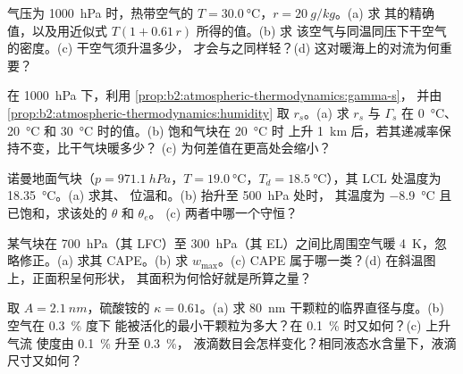 \begin{exercise}[$\star\star$]\label{exo:b2:atmospheric-thermodynamics:5}
气压为 \qty{1000}{hPa} 时，热带空气的 $T = \qty{30.0}{\celsius}$，$r = \qty{20}{g/kg}$。(a) 求
其的精确值，以及用近似式 $T(1 + 0.61\,r)$ 所得的值。(b) 求
该空气与同温同压下干空气的密度。(c) 干空气须升温多少，
才会与之同样轻？(d) 这对暖海上的对流为何重要？
\end{exercise}

\begin{exercise}[$\star\star$]\label{exo:b2:atmospheric-thermodynamics:6}
在 \qty{1000}{hPa} 下，利用 \cref{prop:b2:atmospheric-thermodynamics:gamma-s}，
并由 \cref{prop:b2:atmospheric-thermodynamics:humidity} 取 $r_s$。(a) 求 $r_s$ 与 $\Gamma_s$ 在
\qty{0}{\celsius}、\qty{20}{\celsius} 和 \qty{30}{\celsius} 时的值。(b) 饱和气块在 \qty{20}{\celsius} 时
上升 \qty{1}{km} 后，若其递减率保持不变，比干气块暖多少？
(c) 为何差值在更高处会缩小？
\end{exercise}

\begin{exercise}[$\star\star$]\label{exo:b2:atmospheric-thermodynamics:7}
诺曼地面气块（$p = \qty{971.1}{hPa}$，$T = \qty{19.0}{\celsius}$，$T_d =
\qty{18.5}{\celsius}$），其 LCL 处温度为 \qty{18.35}{\celsius}。(a) 求其、
位温和。(b) 抬升至 \qty{500}{hPa} 处时，
其温度为 \qty{-8.9}{\celsius} 且已饱和，求该处的 $\theta$ 和 $\theta_e$。
(c) 两者中哪一个守恒？
\end{exercise}

\begin{exercise}[$\star\star$]\label{exo:b2:atmospheric-thermodynamics:8}
某气块在 \qty{700}{hPa}（其 LFC）至
\qty{300}{hPa}（其 EL）之间比周围空气暖 \qty{4}{K}，忽略修正。(a) 求其 CAPE。(b)
求 $w_{\max}$。(c) CAPE 属于哪一类？(d) 在斜温图上，正面积呈何形状，
其面积为何恰好就是所算之量？
\end{exercise}

\begin{exercise}[$\star\star$]\label{exo:b2:atmospheric-thermodynamics:9}
取 $A = \qty{2.1}{nm}$，硫酸铵的 $\kappa = 0.61$。(a) 求
\qty{80}{nm} 干颗粒的临界直径与度。(b) 空气在 \qty{0.3}{\percent} 度下
能被活化的最小干颗粒为多大？在 \qty{0.1}{\percent} 时又如何？(c) 上升气流
使度由 \qty{0.1}{\percent} 升至 \qty{0.3}{\percent}，
液滴数目会怎样变化？相同液态水含量下，液滴尺寸又如何？
\end{exercise}

